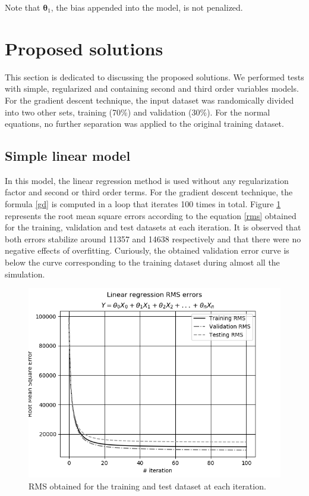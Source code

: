 \documentclass[10pt,twocolumn,letterpaper]{article}
\begin{document}
Note that \(\bm {\theta}_1 \), the bias appended into the model, is not penalized.

\section{Proposed solutions}

This section is dedicated to discussing the proposed solutions. We performed tests with simple, regularized and containing second and third order variables models. For the gradient descent technique, the input dataset was randomically divided into two other sets, training (70\%) and validation (30\%). For the normal equations, no further separation was applied to the original training dataset.

\subsection {Simple linear model}

In this model, the linear regression method is used without any regularization factor and second or third order terms. For the gradient descent technique, the formula \ref {gd} is computed in a loop that iterates 100 times in total. Figure \ref {fig:lr-gd} represents the root mean square errors according to the equation \ref{rms} obtained for the training, validation and  test datasets at each iteration. It is observed that both errors stabilize around 11357 and 14638 respectively and that there were no negative effects of overfitting. Curiously, the obtained validation error curve is below the curve corresponding to the training dataset during almost all the simulation.

\begin{figure}
    \centering
    \includegraphics[width=0.9\columnwidth]{img/lr-gd.png}
    \caption{RMS obtained for the training and test dataset at each iteration.}
    \label{fig:lr-gd}
\end{figure}
\end{document}
